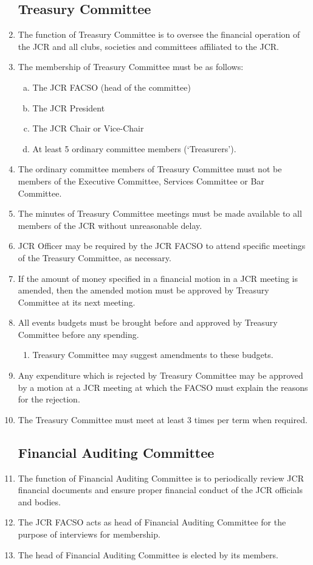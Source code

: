 \documentclass[12pt]{article}  %
\begin{document}
\begin{enumerate}
    \subsection{Treasury Committee}
    \item The function of Treasury Committee is to oversee the financial operation of the JCR and all clubs, societies and committees affiliated to the JCR.
    \item The membership of Treasury Committee must be as follows:
    \begin{enumerate}[(a)]
        \item The JCR FACSO (head of the committee)
        \item The JCR President
        \item The JCR Chair or Vice-Chair 
        \item At least 5 ordinary committee members (‘Treasurers’).
    \end{enumerate}
    \item The ordinary committee members of Treasury Committee must not be members of the Executive Committee, Services Committee or Bar Committee.
    \item The minutes of Treasury Committee meetings must be made available to all members of the JCR without unreasonable delay.
    \item JCR Officer may be required by the JCR FACSO to attend specific meetings of the Treasury Committee, as necessary.
    \item If the amount of money specified in a financial motion in a JCR meeting is amended, then the amended motion must be approved by Treasury Committee at its next meeting.
    \item All events budgets must be brought before and approved by Treasury Committee before any spending.
    \begin{enumerate}
        \item Treasury Committee may suggest amendments to these budgets.
    \end{enumerate}
    \item Any expenditure which is rejected by Treasury Committee may be approved by a motion at a JCR meeting at which the FACSO must explain the reasons for the rejection.
    \item The Treasury Committee must meet at least 3 times per term when required.
    \subsection{Financial Auditing Committee}
    \item The function of Financial Auditing Committee is to periodically review JCR financial documents and ensure proper financial conduct of the JCR officials and bodies.
    \item The JCR FACSO acts as head of Financial Auditing Committee for the purpose of interviews for membership.
    \item The head of Financial Auditing Committee is elected by its members.
\end{enumerate}
\end{document}

